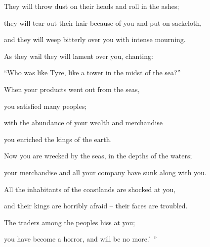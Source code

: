 {\par }{\Q They will throw
dust
on
their heads
and roll
in the ashes;
\par }{\Q {}they will tear
out their hair
because of you and put on
sackcloth,
\par }{\Q and they will weep
bitterly
over you with intense
mourning.
\par }{\Q {}As they wail
they will lament
over you, chanting:
\par }{\Q “Who
was like Tyre,
like a tower
in the midst
of the sea?”
\par }{\Q {}When
your products
went out from
the seas,
\par }{\Q you satisfied
many
peoples;
\par }{\Q with the abundance
of your wealth
and merchandise
\par }{\Q you enriched
the kings
of the earth.
\par }{\Q {}Now you are wrecked
by the seas,
in the depths
of the waters;
\par }{\Q your merchandise
and all
your company
have sunk along with you.
\par }{\Q {}All
the inhabitants
of the coastlands
are shocked
at you,
\par }{\Q and their kings
are horribly afraid – their faces are troubled.
\par }{\Q {}The traders
among the peoples
hiss
at you;
\par }{\Q you have become a horror,
and will be no
more.’ ”

\par }
